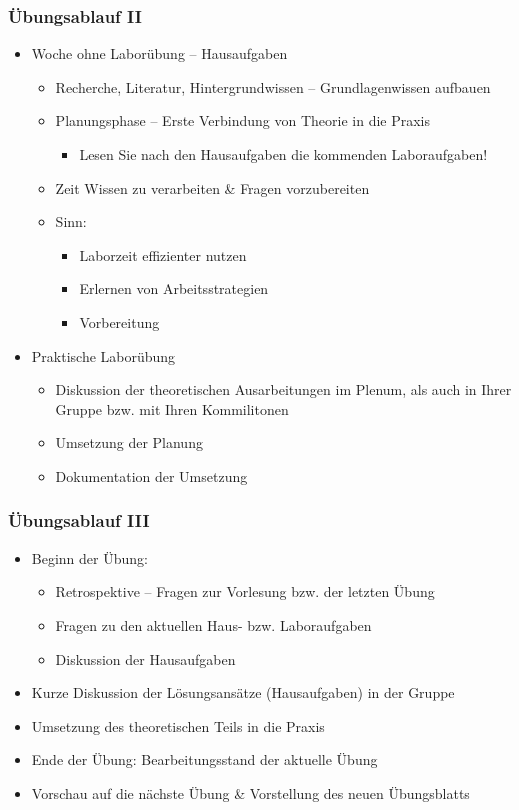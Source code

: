 \documentclass[xcolor=dvipsnames,aspectratio=169]{beamer}
\begin{document}
\begin{frame}
	\frametitle{Übungsablauf II}
	\vspace{-0.8cm}
	\begin{itemize}
		\item Woche ohne Laborübung -- Hausaufgaben
		\begin{itemize}
			\item Recherche, Literatur, Hintergrundwissen -- Grundlagenwissen aufbauen
			\item Planungsphase -- Erste Verbindung von Theorie in die Praxis
			\begin{itemize}
				\item Lesen Sie nach den Hausaufgaben die kommenden Laboraufgaben!
			\end{itemize}
			\item Zeit Wissen zu verarbeiten \& Fragen vorzubereiten
			\item Sinn:
			\begin{itemize}
				\item Laborzeit effizienter nutzen
				\item Erlernen von Arbeitsstrategien
				\item Vorbereitung
			\end{itemize}
		\end{itemize}
		\item Praktische Laborübung
		\begin{itemize}
			\item Diskussion der theoretischen Ausarbeitungen im Plenum, als auch in Ihrer Gruppe bzw. mit Ihren Kommilitonen
			\item Umsetzung der Planung
			\item Dokumentation der Umsetzung
		\end{itemize}
	\end{itemize}
\end{frame}

\begin{frame}
	\frametitle{Übungsablauf III}
	\begin{itemize}
		\item Beginn der Übung:
		\begin{itemize}
			\item Retrospektive -- Fragen zur Vorlesung bzw. der letzten Übung
			\item Fragen zu den aktuellen Haus- bzw. Laboraufgaben 
			\item Diskussion der Hausaufgaben
		\end{itemize}
		\item Kurze Diskussion der Lösungsansätze (Hausaufgaben) in der Gruppe
		\item Umsetzung des theoretischen Teils in die Praxis
		\item Ende der Übung: Bearbeitungsstand der aktuelle Übung
		\item Vorschau auf die nächste Übung \& Vorstellung des neuen Übungsblatts
	\end{itemize}
\end{frame}
\end{document}
